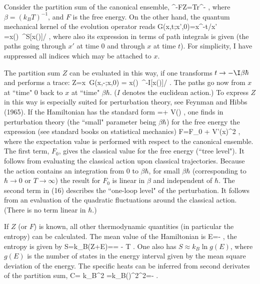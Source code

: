 Consider the partition sum of the canonical ensemble,
\be \E^{-\beta F}\equiv Z=\mbox{Tr}\E^{-\beta{}} \enspace , \ee
where $\beta=(k_BT)^{-1}$, and $F$ is the free energy.
On the other hand, the quantum mechanical kernel of the evolution
operator reads
\be G(x,t;x',0)=\langle x\vert\E^{-\I t/\hbar}\vert x'
    \rangle =x(\tau)\ \E^{\I S[x(\tau)]/\hbar}
    \enspace , \ee
where also its expression in terms of path integrals is given
(the paths going through $x'$ at time $0$ and through $x$ at
time $t$). For simplicity, I have suppressed all indices which may
be attached to $x$.

The partition sum $Z$ can be evaluated in this way, if one
transforms $t\to -\I\beta\hbar$ and performs a trace:
\be Z=\int \D x\ G(x,-\I\beta\hbar;x,0)
     = x(\tau)\ \E^{-I[x(\tau)]/\hbar} \enspace . \ee
The paths go now from $x$ at ``time" $0$ back to $x$ at ``time"
$\beta\hbar$. ($I$ denotes the euclidean action.)
 To express $Z$ in this way is especially suited
for perturbation theory, see Feynman and Hibbs (1965).
If the Hamiltonian has the standard form
\be {}=+ V() \enspace , \ee
one finds in perturbation theory (the ``small" parameter
being $\beta\hbar$)
 for the free energy
the expression (see standard books on statistical mechanics)
\be F=F_0 + \langle V'(x)^2\rangle
    \enspace , \ee
where the expectation value is performed with respect to the
canonical ensemble. The first term, $F_0$, gives the classical
value for the free energy (``tree level"). It follows from
evaluating the classical action upon classical trajectories.
Because the action contains an integration from $0$ to $\beta\hbar$,
for small $\beta\hbar$ (corresponding to $\hbar\to0$
or $T\to\infty$) the result for $F_0$ is linear in $\beta$
and independent of $\hbar$. The second term in (16) 
describes the ``one-loop level" of the perturbation. It follows from
an evaluation of the quadratic fluctuations around the classical
action. (There is no term linear in $\hbar$.)

If $Z$ (or $F$) is known, all other thermodynamic quantities
(in particular the entropy) can be calculated. The mean value
of the Hamiltonian is
\be \langle{}\rangle \equiv E=-
     \enspace , \ee
the entropy is given by
\be S=k_B(\ln Z+\beta E)== -
     {\partial T} \enspace . \ee
One also has $S\approx k_B\ln g(E)$, where $g(E)$ is the number
of states in the energy interval given by the mean square deviation
of the energy. The specific heats can be inferred from
second derivates of the partition sum,
\be  C= k_B\beta^2
    =k_B(\Delta{})^2\beta^2=-\beta{}
    \enspace . \ee

